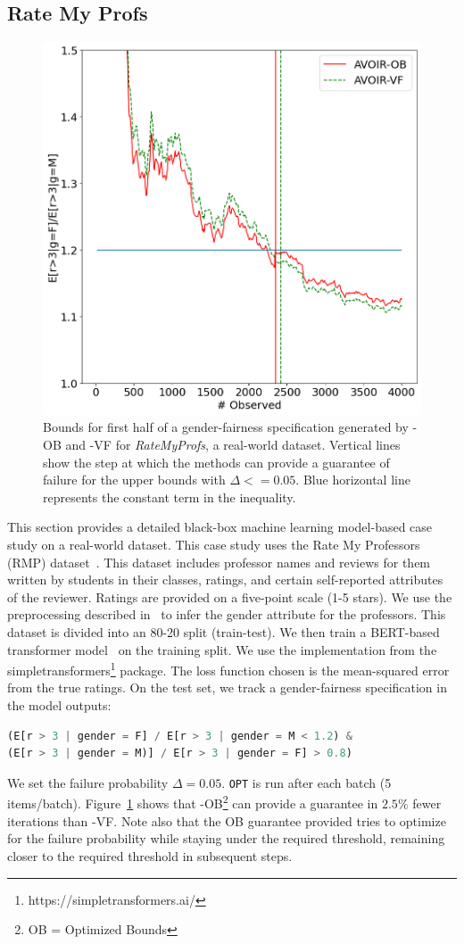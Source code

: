 \subsection{Rate My Profs}
\label{sec:casestudy:rmp}
\begin{figure}
    \centering
    \includegraphics[width=0.5\linewidth]{avoir/images/ratemyprofs.png}
    \caption{Bounds for first half of a gender-fairness specification generated by \AVOIRmethodname{}-OB and \AVOIRmethodname{}-VF for \textit{RateMyProfs}, a real-world dataset. Vertical lines show the step at which the methods can provide a guarantee of failure for the upper bounds with $\Delta <= 0.05$. Blue horizontal line represents the constant term in the inequality.}
    \label{fig:casestudy:rmp}
\end{figure}
This section provides a detailed black-box machine learning model-based case study on a real-world dataset.
This case study uses the Rate My Professors (RMP) dataset~\cite{keymanesh2021fairness}. 
This dataset includes professor names and reviews for them written by students in their classes, ratings, and certain self-reported attributes of the reviewer.
Ratings are provided on a five-point scale (1-5 stars).
We use the preprocessing described in~\cite{keymanesh2021fairness} to infer the gender attribute for the professors.
This dataset is divided into an 80-20 split (train-test).
We then train a BERT-based transformer model~\cite{devlin2019bert} on the training split.
We use the implementation from the simpletransformers\footnote{https://simpletransformers.ai/} package.
The loss function chosen is the mean-squared error from the true ratings.
On the test set, we track a gender-fairness specification in the model outputs:
\begin{lstlisting}[columns=flexible, language=Python, basicstyle=\small]
(E[r > 3 | gender = F] / E[r > 3 | gender = M < 1.2) & 
(E[r > 3 | gender = M)] / E[r > 3 | gender = F] > 0.8)
\end{lstlisting}
We set the failure probability $\Delta = 0.05$. 
\texttt{OPT} is run after each batch (5 items/batch).
Figure~\ref{fig:casestudy:rmp} shows that \AVOIRmethodname{}-OB\footnote{OB = Optimized Bounds} can provide a guarantee in $\mathbf{2.5\%}$ fewer iterations than \AVOIRmethodname{}-VF. 
Note also that the OB guarantee provided tries to optimize for the failure probability while staying under the required threshold, remaining closer to the required threshold in subsequent steps.

